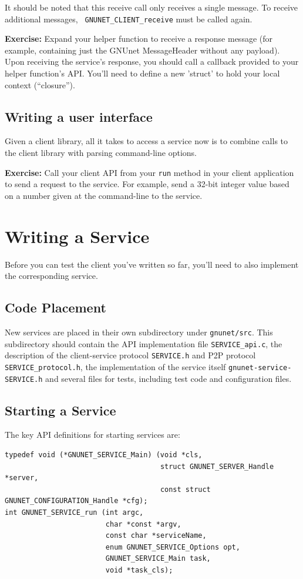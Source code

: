 \documentclass[10pt]{article}
\newcommand{\exercise}[1]{\noindent\begin{boxedminipage}{\textwidth}{\bf Exercise:} #1 \end{boxedminipage}}
\begin{document}
It should be noted that this receive call only receives a single
message.  To receive additional messages, {\tt
  GNUNET\_CLIENT\_receive} must be called again.

\exercise{Expand your helper function to receive a
response message (for example, containing just the GNUnet MessageHeader
without any payload).  Upon receiving the service's response, you should
call a callback provided to your helper function's API.  You'll need to 
define a new 'struct' to hold your local context (``closure'').}


\subsection{Writing a user interface}

Given a client library, all it takes to access a service now is to
combine calls to the client library with parsing command-line
options.

\exercise{Call your client API from your {\tt run} method
in your client application to send a request to the service.
For example, send a 32-bit integer value based on a number given
at the command-line to the service.}


  
\section{Writing a Service}

Before you can test the client you've written so far, you'll need to also
implement the corresponding service.


\subsection{Code Placement}

New services are placed in their own subdirectory under {\tt gnunet/src}.
This subdirectory should contain the API implementation file {\tt SERVICE\_api.c},
the description of the client-service protocol {\tt SERVICE.h} and P2P protocol
{\tt SERVICE\_protocol.h}, the implementation of the service itself
{\tt gnunet-service-SERVICE.h} and several files for tests, including test code
and configuration files.

\subsection{Starting a Service}

The key API definitions for starting services are:
\lstset{language=C}
\begin{lstlisting}
typedef void (*GNUNET_SERVICE_Main) (void *cls,
                                     struct GNUNET_SERVER_Handle *server,
                                     const struct GNUNET_CONFIGURATION_Handle *cfg);
int GNUNET_SERVICE_run (int argc,
                        char *const *argv,
                        const char *serviceName,
                       	enum GNUNET_SERVICE_Options opt,
                        GNUNET_SERVICE_Main task,
                        void *task_cls);
\end{lstlisting}
\end{document}
